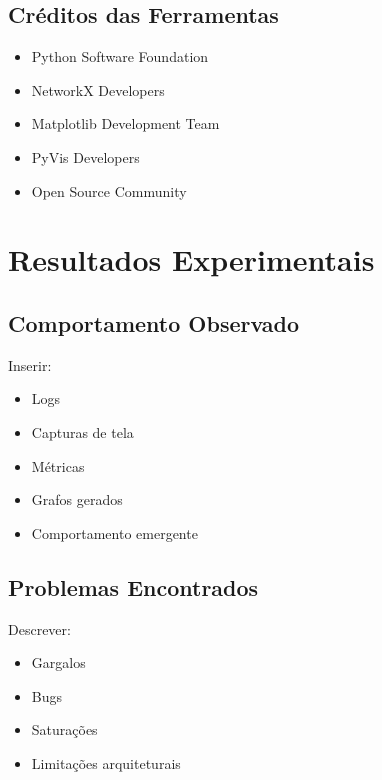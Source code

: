\documentclass[12pt,a4paper]{article}
\begin{document}
\vspace{0.5cm}

\subsection{Créditos das Ferramentas}

\begin{itemize}

    \item Python Software Foundation
    \item NetworkX Developers
    \item Matplotlib Development Team
    \item PyVis Developers
    \item Open Source Community

\end{itemize}


\section{Resultados Experimentais}

\subsection{Comportamento Observado}

Inserir:
\begin{itemize}

    \item Logs
    \item Capturas de tela
    \item Métricas
    \item Grafos gerados
    \item Comportamento emergente

\end{itemize}

\vspace{0.5cm}

\subsection{Problemas Encontrados}

Descrever:
\begin{itemize}

    \item Gargalos
    \item Bugs
    \item Saturações
    \item Limitações arquiteturais

\end{itemize}
\end{document}
